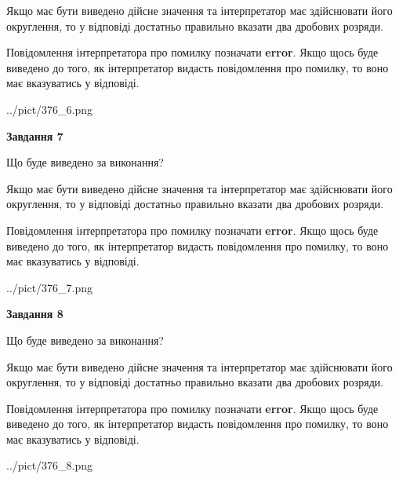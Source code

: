 \documentclass[12pt, ukrainian]{article}
\begin{document}
{\begin {Large}
Якщо має бути виведено дійсне значення та інтерпретатор має здійснювати його округлення, 
то у відповіді достатньо правильно вказати два дробових розряди.

Повідомлення інтерпретатора про помилку позначати \textbf{error}.
Якщо щось буде виведено до того, як інтерпретатор видасть повідомлення про помилку, 
то воно має вказуватись у відповіді. \par

\begin{center}
	{../pict/376_6.png}
\end{center}
\newpage

{\begin {center}\textbf{Завдання 7}\end {center}}\par
Що буде виведено за виконання? \par

Якщо має бути виведено дійсне значення та інтерпретатор має здійснювати його округлення, 
то у відповіді достатньо правильно вказати два дробових розряди.

Повідомлення інтерпретатора про помилку позначати \textbf{error}.
Якщо щось буде виведено до того, як інтерпретатор видасть повідомлення про помилку, 
то воно має вказуватись у відповіді. \par

\begin{center}
	{../pict/376_7.png}
\end{center}
\newpage

{\begin {center}\textbf{Завдання 8}\end {center}}\par
Що буде виведено за виконання? \par

Якщо має бути виведено дійсне значення та інтерпретатор має здійснювати його округлення, 
то у відповіді достатньо правильно вказати два дробових розряди.

Повідомлення інтерпретатора про помилку позначати \textbf{error}.
Якщо щось буде виведено до того, як інтерпретатор видасть повідомлення про помилку, 
то воно має вказуватись у відповіді. \par

\begin{center}
	{../pict/376_8.png}
\end{center}
\newpage


\end{Large}}
\end{document}
